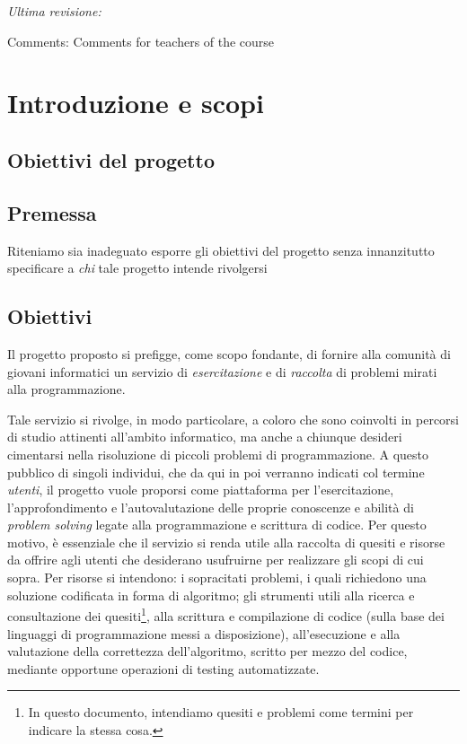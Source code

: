 \documentclass[11pt, a4paper]{article}
\newcommand{\comments}{Comments for teachers of the course}
\begin{document}
\begin{titlepage}


\vfill\vfill
\textit{Ultima revisione:}
{\@date}
\vfill\vfill\vfill

\footnotesize{Comments: \comments}


\end{titlepage}

\tableofcontents

\newpage
\section{Introduzione e scopi}
\subsection{Obiettivi del progetto}


\subsection{Premessa}
Riteniamo sia inadeguato esporre gli obiettivi del progetto senza innanzitutto specificare a \textit{chi} tale progetto intende rivolgersi

\subsection{Obiettivi}
Il progetto proposto si prefigge, come scopo fondante, di fornire alla comunità
di giovani informatici un servizio di \textit{esercitazione} e di
\textit{raccolta} di problemi mirati alla programmazione.

Tale servizio si rivolge, in modo particolare, a coloro che sono coinvolti
in percorsi di studio attinenti all'ambito informatico, ma anche a chiunque
desideri cimentarsi nella risoluzione di piccoli problemi di programmazione.
A questo pubblico di singoli individui, che da qui in poi verranno indicati
col termine \textit{utenti}, il progetto vuole proporsi come piattaforma per l'esercitazione, l'approfondimento e l'autovalutazione delle proprie conoscenze e abilità di \textit{problem solving}
legate alla programmazione e scrittura di codice. Per questo motivo, è essenziale che il servizio
si renda utile alla raccolta di quesiti e risorse da offrire agli utenti
che desiderano usufruirne per realizzare gli scopi di cui sopra.
Per risorse si intendono: i sopracitati problemi, i quali richiedono
una soluzione codificata in forma di algoritmo;
gli strumenti utili alla ricerca e consultazione dei
quesiti\footnote{In questo documento, intendiamo quesiti e problemi
come termini per indicare la stessa cosa.}, alla scrittura e
compilazione di codice (sulla base dei linguaggi di programmazione
messi a disposizione), all'esecuzione e alla valutazione della
correttezza dell'algoritmo, scritto per mezzo del codice, mediante
opportune operazioni di testing automatizzate.
\end{document}
